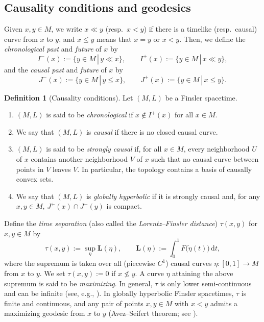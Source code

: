 \documentclass[a4paper,11pt]{article}
\numberwithin{equation}{section}
\theoremstyle{definition}
\newtheorem{definition}{Definition}[section]
\theoremstyle{plain}
\newcommand{\lra}{\longrightarrow}
\newcommand{\bL}{\mathbf{L}}
\newcommand{\dd}{\mathrm{d}}
\begin{document}
\subsection{Causality conditions and geodesics}%

Given $x,y \in M$, we write $x \ll y$ (resp.\ $x<y$)
if there is a timelike (resp.\ causal) curve from $x$ to $y$,
and $x \le y$ means that $x=y$ or $x<y$.
Then, we define the \emph{chronological past} and \emph{future} of $x$ by
\[ I^-(x):=\{y \in M \,|\, y \ll x\}, \qquad I^+(x):=\{y \in M \,|\, x \ll y\}, \]
and the \emph{causal past} and \emph{future} of $x$ by
\[ J^-(x):=\{y \in M \,|\, y \le x\}, \qquad J^+(x):=\{y \in M \,|\, x \le y\}. \]

\begin{definition}[Causality conditions]\label{df:causal}
Let $(M,L)$ be a Finsler spacetime.
\begin{enumerate}[(1)]
\item $(M,L)$ is said to be \emph{chronological} if $x \notin I^+(x)$ for all $x\in M$.
\item We say that $(M,L)$ is \emph{causal} if there is no closed causal curve.
\item $(M,L)$ is said to be \emph{strongly causal} if, for all $x \in M$,
every neighborhood $U$ of $x$ contains another neighborhood $V$ of $x$
such that no causal curve between points in $V$ leaves $V$.
In particular, the topology contains a basis of causally convex sets. 
\item We say that $(M,L)$ is \emph{globally hyperbolic}
if it is strongly causal and, for any $x,y \in M$, $J^+(x) \cap J^-(y)$ is compact.
\end{enumerate}
\end{definition}

Define the \emph{time separation} (also called the \emph{Lorentz--Finsler distance})
$\tau(x,y)$ for $x,y \in M$ by
\[ \tau(x,y) :=\sup_{\eta} \bL(\eta), \qquad
\bL(\eta) :=\int_0^1 F\bigl( \dot{\eta}(t) \bigr) \,\dd t, \]
where the supremum is taken over all (piecewise $C^1$) causal curves $\eta\colon [0,1] \lra M$ from $x$ to $y$. 
We set $\tau(x,y):=0$ if $x \not\le y$.
A curve $\eta$ attaining the above supremum is said to be \emph{maximizing}.
%
In general, $\tau$ is only lower semi-continuous
and can be infinite (see, e.g., \cite[Proposition~6.7]{Min-Ray}).
In globally hyperbolic Finsler spacetimes, $\tau$ is finite and continuous,
and any pair of points $x,y \in M$ with $x<y$ admits a maximizing geodesic from $x$ to $y$
(Avez--Seifert theorem; see \cite[Propositions~6.8, 6.9]{Min-Ray}).
\end{document}
